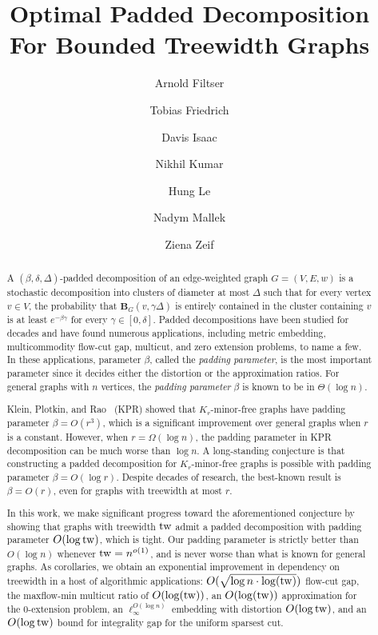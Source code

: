 \documentclass{article}
\author{Arnold Filtser \and Tobias Friedrich \and Davis Isaac \and Nikhil Kumar \and Hung Le \and Nadym Mallek \and Ziena Zeif}\date{}
\title{Optimal Padded Decomposition For Bounded Treewidth Graphs}
\newcommand{\tw}{{\rm tw}}
\def\ball{\mathbf{B}}
\begin{document}
\maketitle





\begin{abstract}
  A $(\beta,\delta,\Delta)$-padded decomposition of an edge-weighted graph $G = (V,E,w)$ is a stochastic decomposition into clusters of diameter at most $\Delta$ such that for every vertex $v\in V$, the probability that $\ball_G(v,\gamma\Delta)$ is entirely contained in the cluster containing $v$ is at least $e^{-\beta\gamma}$ for every $\gamma \in [0,\delta]$. Padded decompositions have been studied for decades and have found numerous applications, including metric embedding, multicommodity flow-cut gap, multicut, and zero extension problems, to name a few. In these applications, parameter $\beta$, called the \emph{padding parameter}, is the most important parameter since it decides either the distortion or the approximation ratios. For general graphs with $n$ vertices, the \emph{padding parameter} $\beta$ is known to be in $\Theta(\log n)$.
 
 Klein, Plotkin, and Rao~\cite{KPR93} (KPR) showed that $K_r$-minor-free graphs have padding parameter $\beta = O(r^3)$, which is a significant improvement over general graphs when $r$ is a constant. However, when $r= \Omega(\log n)$, the padding parameter in KPR decomposition can be much worse than $\log n$.  A long-standing conjecture is that constructing a padded
decomposition for $K_r$-minor-free graphs is possible with padding parameter $\beta = O(\log r)$. Despite decades of research, the best-known result is $\beta = O(r)$, even for graphs with treewidth at most $r$.

In this work, we make significant progress toward the aforementioned conjecture by showing that graphs with treewidth $\tw$ admit a padded decomposition with padding parameter $O(\log \tw)$, which is tight. Our padding parameter is strictly better than $O(\log n)$ whenever $\tw = n^{o(1)}$, and is never worse than what is known for general graphs. As corollaries, we obtain an exponential improvement in dependency on treewidth in a host of algorithmic applications: $O(\sqrt{ \log n \cdot \log(\tw)})$ flow-cut gap,  the maxflow-min multicut ratio of $O(\log(\tw))$, an $O(\log(\tw))$ approximation for the 0-extension problem, an $\ell^{O(\log n)}_\infty$ embedding with distortion $O(\log \tw)$, and an $O(\log \tw)$ bound for integrality gap for the uniform sparsest cut.
\end{abstract}
\end{document}
